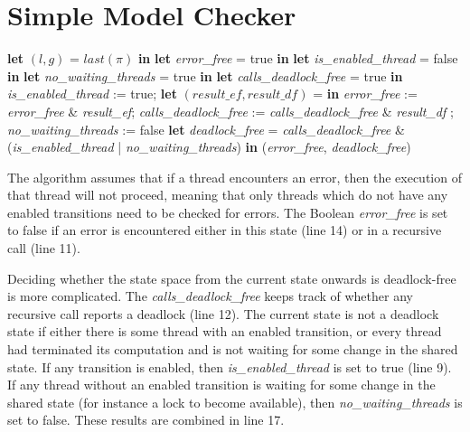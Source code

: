 \documentclass[12pt,a4paper,twoside,openright]{report}
\newcommand{\Let}[2]{\State \textbf{let} #1 = #2 \textbf{in}}
\begin{document}
\section{Simple Model Checker}
\label{sapp:simple-code}
\begin{algorithmic}[1]
	\Let{$(l, g)$}
	{$\textit{last}(\pi)$}
	\Let{\textit{error\_free}}{true}
	\Let{\textit{is\_enabled\_thread}}{false}
	\Let{\textit{no\_waiting\_threads}}{true}
	\Let{\textit{calls\_deadlock\_free}}{true}
	\State \textit{is\_enabled\_thread} := true;
	\Let{$(\textit{result\_ef}, \textit{result\_df})$}
	{\Call{Check}{$\sigma_0, \pi.\textit{next}(\sigma, p)$}}
	\State \textit{error\_free} := \textit{error\_free}
	\& \textit{result\_ef};
	\State \textit{calls\_deadlock\_free}
	:= \textit{calls\_deadlock\_free}
	\& \textit{result\_df}
	\Else
	;
	\EndIf
	{\textit{no\_waiting\_threads} := false}
	\EndIf
	\EndIf
	\EndFor
	\Let{\textit{deadlock\_free}}{\textit{calls\_deadlock\_free} \&
		(\textit{is\_enabled\_thread} | \textit{no\_waiting\_threads})}
	\State \Return (\textit{error\_free}, \textit{deadlock\_free})
	\EndProcedure
\end{algorithmic}

The algorithm assumes that if a thread
encounters an error, then the execution
of that thread will not proceed, meaning
that only threads which do not have any
enabled transitions need to be checked
for errors. The Boolean \textit{error\_free}
is set to false if an error is encountered
either in this state (line 14) or in a
recursive call (line 11).

Deciding whether the state space from the current
state onwards is deadlock-free is more complicated.
The \textit{calls\_deadlock\_free} keeps track of
whether any recursive call reports a deadlock (line 12).
The current state is not a deadlock state
if either there is some thread with an
enabled transition,
or every thread had terminated its computation and
is not waiting for some change in the shared state.
If any transition is enabled, then
\textit{is\_enabled\_thread} is set to true (line 9).
If any thread without an enabled transition is
waiting for some change in the shared state (for
instance a lock to become available), then
\textit{no\_waiting\_threads} is set to false.
These results are combined in line 17.
\end{document}
